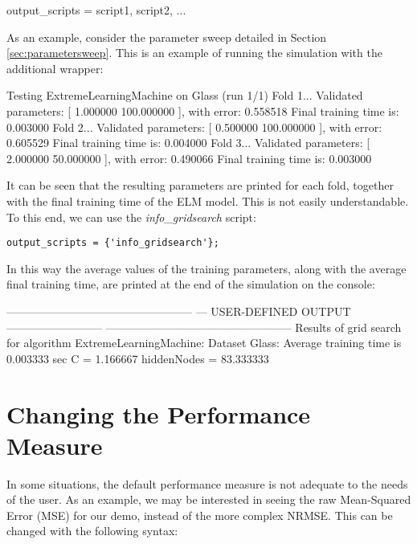\begin{console}
output_scripts = {script1, script2, ...}
\end{console}

\noindent As an example, consider the parameter sweep detailed in Section \ref{sec:parametersweep}. This is an example of running the simulation with the additional wrapper:

\begin{console}
Testing ExtremeLearningMachine on Glass (run 1/1)
	Fold 1... 
		 Validated parameters: [ 1.000000 100.000000 ], 
		 	with error: 0.558518
		 Final training time is: 0.003000
	Fold 2... 
		 Validated parameters: [ 0.500000 100.000000 ], 
		 	with error: 0.605529
		 Final training time is: 0.004000
	Fold 3... 
		 Validated parameters: [ 2.000000 50.000000 ], 
		 	with error: 0.490066
		 Final training time is: 0.003000
\end{console}

\noindent It can be seen that the resulting parameters are printed for each fold, together with the final training time of the ELM model. This is not easily understandable. To this end, we can use the \textit{info\_gridsearch} script:

\begin{lstlisting}
output_scripts = {'info_gridsearch'};
\end{lstlisting}

\noindent In this way the average values of the training parameters, along with the average final training time, are printed at the end of the simulation on the console:

\begin{console}
--------------------------------------------------
--- USER-DEFINED OUTPUT --------------------------
--------------------------------------------------
Results of grid search for algorithm ExtremeLearningMachine: 
   Dataset Glass:
      Average training time is 0.003333 sec
      C = 1.166667
      hiddenNodes = 83.333333
\end{console}

\section{Changing the Performance Measure}
\label{sec:changingperformance}

In some situations, the default performance measure is not adequate to the needs of the user. As an example, we may be interested in seeing the raw Mean-Squared Error (MSE) for our demo, instead of the more complex NRMSE. This can be changed with the following syntax:

